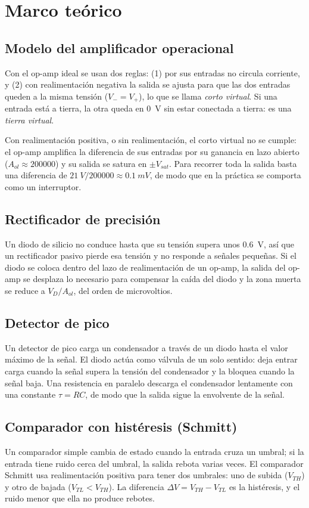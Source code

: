 \documentclass[11pt,letterpaper]{article}
\newcommand{\VTH}{V_{TH}}
\newcommand{\VTL}{V_{TL}}
\newcommand{\Vsat}{V_{sat}}
\begin{document}
\section{Marco teórico}

\subsection{Modelo del amplificador operacional}
Con el op-amp ideal se usan dos reglas: (1) por sus entradas no circula corriente, y (2) con realimentación negativa la salida se ajusta para que las dos entradas queden a la misma tensión ($V_- = V_+$), lo que se llama \emph{corto virtual}. Si una entrada está a tierra, la otra queda en \SI{0}{V} sin estar conectada a tierra: es una \emph{tierra virtual}.

Con realimentación positiva, o sin realimentación, el corto virtual no se cumple: el op-amp amplifica la diferencia de sus entradas por su ganancia en lazo abierto ($A_{ol}\approx\num{200000}$) y su salida se satura en $\pm\Vsat$. Para recorrer toda la salida basta una diferencia de $\SI{21}{V}/\num{200000}\approx\SI{0,1}{mV}$, de modo que en la práctica se comporta como un interruptor.

\subsection{Rectificador de precisión}
Un diodo de silicio no conduce hasta que su tensión supera unos \SI{0,6}{V}, así que un rectificador pasivo pierde esa tensión y no responde a señales pequeñas. Si el diodo se coloca dentro del lazo de realimentación de un op-amp, la salida del op-amp se desplaza lo necesario para compensar la caída del diodo y la zona muerta se reduce a $V_D/A_{ol}$, del orden de microvoltios.

\subsection{Detector de pico}
Un detector de pico carga un condensador a través de un diodo hasta el valor máximo de la señal. El diodo actúa como válvula de un solo sentido: deja entrar carga cuando la señal supera la tensión del condensador y la bloquea cuando la señal baja. Una resistencia en paralelo descarga el condensador lentamente con una constante $\tau=RC$, de modo que la salida sigue la envolvente de la señal.

\subsection{Comparador con histéresis (Schmitt)}
Un comparador simple cambia de estado cuando la entrada cruza un umbral; si la entrada tiene ruido cerca del umbral, la salida rebota varias veces. El comparador Schmitt usa realimentación positiva para tener dos umbrales: uno de subida ($\VTH$) y otro de bajada ($\VTL<\VTH$). La diferencia $\Delta V=\VTH-\VTL$ es la histéresis, y el ruido menor que ella no produce rebotes.
\end{document}
